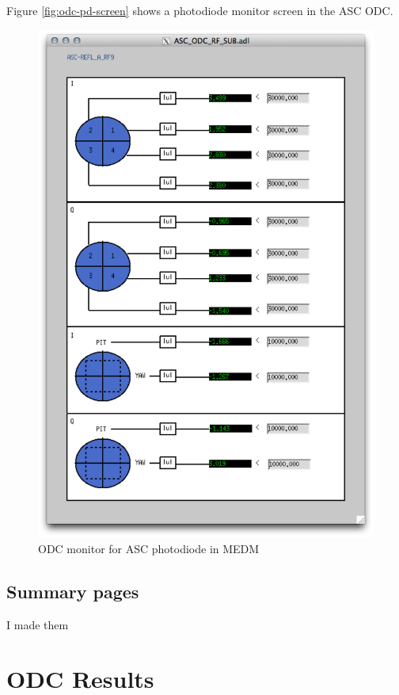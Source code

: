 Figure \ref{fig:odc-pd-screen} shows a photodiode monitor screen in the ASC ODC. 

\begin{figure}[ht!]
\includegraphics[width=\textwidth]{figures/ODC/PD_screen}
\caption[ASC ODC Photodiode Monitor in MEDM]{ODC monitor for ASC photodiode in MEDM}
\end{figure}\label{fig:odc-pd-screen}

\subsection{Summary pages}
I made them

\section{ODC Results}

